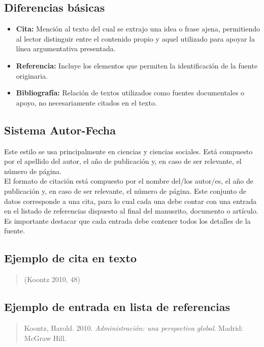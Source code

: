 \documentclass[12pt,a4paper]{article}
\begin{document}
\begin{enumerate}[resume]
\subsection*{Diferencias básicas}
\begin{itemize}
    \item \textbf{Cita:} Mención al texto del cual se extrajo una idea o frase ajena, permitiendo al lector distinguir entre el contenido propio y aquel utilizado para apoyar la línea argumentativa presentada.
    \item \textbf{Referencia:} Incluye los elementos que permiten la identificación de la fuente originaria.
    \item \textbf{Bibliografía:} Relación de textos utilizados como fuentes documentales o apoyo, no necesariamente citados en el texto.
\end{itemize}

\subsection{Sistema Autor-Fecha}
Este estilo se usa principalmente en ciencias y ciencias sociales. Está compuesto por el apellido del autor, el año de publicación y, en caso de ser relevante, el número de página.\\

El formato de citación está compuesto por el nombre del/los autor/es, el año de publicación y, en caso de ser relevante, el número de página. Este conjunto de datos corresponde a una cita, para lo cual cada una debe contar con una entrada en el listado de referencias dispuesto
al final del manusrito, documento o artículo. Es importante destacar que cada entrada debe contener todos los detalles de la fuente.

\subsection*{Ejemplo de cita en texto}
\begin{quote}
(Koontz 2010, 48)
\end{quote}

\subsection*{Ejemplo de entrada en lista de referencias}
\begin{quote}
Koontz, Harold. 2010. \textit{Administración: una perspectiva global}. Madrid: McGraw Hill.
\end{quote}


\end{enumerate}
\end{document}
